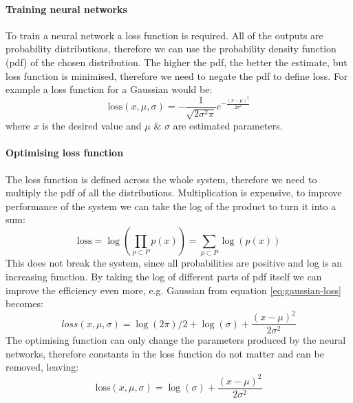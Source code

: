 \documentclass[12pt,a4paper]{book}
\begin{document}
\paragraph{Training neural networks}
To train a neural network a loss function is required.
All of the outputs are probability distributions, therefore we can use the probability density function (pdf) of the chosen distribution.
The higher the pdf, the better the estimate, but loss function is minimised, therefore we need to negate the pdf to define loss.
For example a loss function for a Gaussian would be:
\begin{equation}
\text{loss}(x,\mu,\sigma) = -\frac{1}{\sqrt{2\sigma^2\pi}}e^{-\frac{(x-\mu)^2}{2\sigma^2}}
\label{eq:gaussian-loss}
\end{equation}
where $x$ is the desired value and $\mu$ \& $\sigma$ are estimated parameters.

\paragraph{Optimising loss function}
The loss function is defined across the whole system, therefore we need to multiply the pdf of all the distributions.
Multiplication is expensive, to improve performance of the system we can take the log of the product to turn it into a sum:
\begin{equation}
\text{loss} = \log\left(\prod_{p\subset P}p(x)\right) = \sum_{p\subset P}\log(p(x))
\end{equation}
This does not break the system, since all probabilities are positive and log is an increasing function.
By taking the log of different parts of pdf itself we can improve the efficiency even more, e.g. Gaussian from equation \ref{eq:gaussian-loss} becomes:
\begin{equation}
{loss}(x,\mu,\sigma) = \log(2\pi)/2+\log(\sigma)+\frac{(x-\mu)^2}{2\sigma^2}
\end{equation}
The optimising function can only change the parameters produced by the neural networks, therefore constants in the loss function do not matter and can be removed, leaving:
\begin{equation}
\text{loss}(x,\mu,\sigma) = \log(\sigma)+\frac{(x-\mu)^2}{2\sigma^2}
\end{equation}
\end{document}
